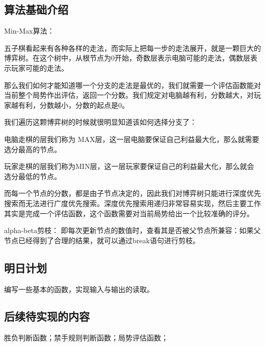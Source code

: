 \subsection{算法基础介绍}

Min-Max算法：

五子棋看起来有各种各样的走法，而实际上把每一步的走法展开，就是一颗巨大的博弈树。在这个树中，从根节点为0开始，奇数层表示电脑可能的走法，偶数层表示玩家可能的走法。

那么我们如何才能知道哪一个分支的走法是最优的，我们就需要一个评估函数能对当前整个局势作出评估，返回一个分数。我们规定对电脑越有利，分数越大，对玩家越有利，分数越小，分数的起点是0。

我们遍历这颗博弈树的时候就很明显知道该如何选择分支了：

电脑走棋的层我们称为 MAX层，这一层电脑要保证自己利益最大化，那么就需要选分最高的节点。

玩家走棋的层我们称为MIN层，这一层玩家要保证自己的利益最大化，那么就会选分最低的节点。

而每一个节点的分数，都是由子节点决定的，因此我们对博弈树只能进行深度优先搜索而无法进行广度优先搜索。深度优先搜索用递归非常容易实现，然后主要工作其实是完成一个评估函数，这个函数需要对当前局势给出一个比较准确的评分。

alpha-beta剪枝：
即每次更新节点的数值时，查看其是否被父节点所兼容：如果父节点已经得到了合理的结果，就可以通过break语句进行剪枝。


\subsection{明日计划} %
编写一些基本的函数，实现输入与输出的读取。

\subsection{后续待实现的内容} %

胜负判断函数；禁手规则判断函数；局势评估函数；
